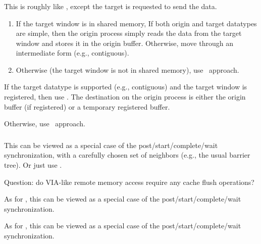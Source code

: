 \documentclass{article}
\begin{document}
\subsubsection{}
\begin{tcp}
This is roughly like , except the target is requested to send
the data.  
\end{tcp}
\begin{shmem}
\begin{enumerate}
\item If the target window is in shared memory, 
If both origin and target datatypes are simple, then the origin process simply
reads the data from the target window and stores it in the origin buffer.
Otherwise, move through an intermediate form (e.g., contiguous).  

\item Otherwise (the target window is not in shared memory), 
use \tcpname\ approach.
\end{enumerate}
\end{shmem}
\begin{via}
If the target datatype is supported (e.g., contiguous) and the target window
is registered, then use .  The destination on the origin
process is either the origin buffer (if registered) or a temporary registered
buffer.  

Otherwise, use \tcpname\ approach.
\end{via}

\subsubsection{}
\begin{tcp}
This can be viewed as a special case of the post/start/complete/wait
synchronization, with a carefully chosen set of neighbors (e.g., the usual
barrier tree).  Or just use .  

Question: do VIA-like remote memory access require any cache flush operations?
\end{tcp}

\begin{shmem}
As for \tcpname, this can be viewed as a special case of the
post/start/complete/wait synchronization. 
\end{shmem}

\begin{via}
As for \tcpname, this can be viewed as a special case of the
post/start/complete/wait synchronization. 
\end{via}
\end{document}
